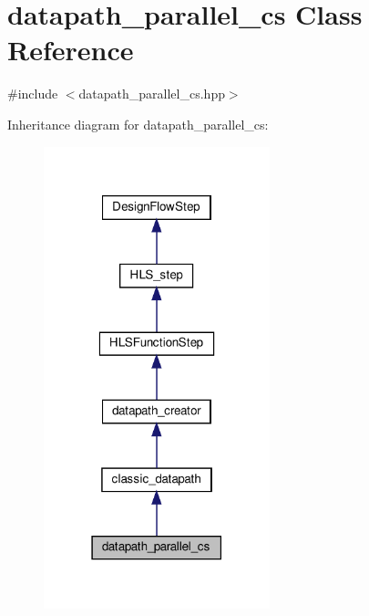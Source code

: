 \hypertarget{classdatapath__parallel__cs}{}\section{datapath\+\_\+parallel\+\_\+cs Class Reference}
\label{classdatapath__parallel__cs}


{\ttfamily \#include $<$datapath\+\_\+parallel\+\_\+cs.\+hpp$>$}



Inheritance diagram for datapath\+\_\+parallel\+\_\+cs\+:
\nopagebreak
\begin{figure}[H]
\begin{center}
\leavevmode
\includegraphics[width=186pt]{d2/dec/classdatapath__parallel__cs__inherit__graph}
\end{center}
\end{figure}


